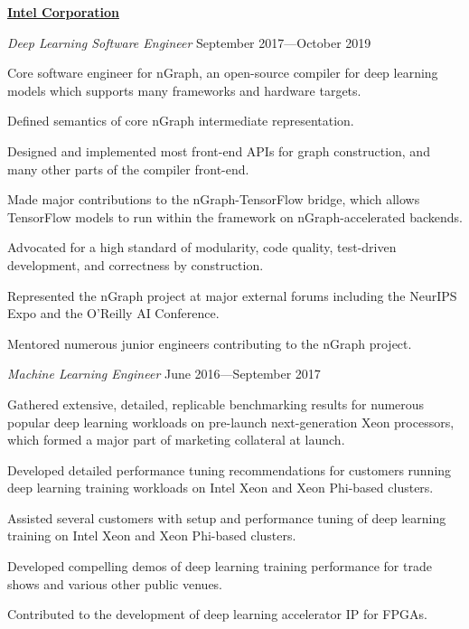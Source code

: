 \documentclass[10pt]{article}
\newenvironment{outerlist}[1][\enskip\textbullet]%
        {\begin{itemize}[#1]}{\end{itemize}%
         \vspace{-.6\baselineskip}}
\newenvironment{innerlist}[1][\enskip\textbullet]%
        {\begin{compactitem}[#1]}{\end{compactitem}}
\begin{document}
\textbf{\href{https://www.intel.com/}{Intel Corporation}}
\begin{outerlist}
\item[] \textit{Deep Learning Software Engineer} \hfill September 2017---October 2019
        \begin{innerlist}
        \item Core software engineer for nGraph, an open-source compiler for deep learning models which supports many frameworks and hardware targets.
        \item Defined semantics of core nGraph intermediate representation.
        \item Designed and implemented most front-end APIs for graph construction, and many other parts of the compiler front-end.
        \item Made major contributions to the nGraph-TensorFlow bridge, which allows TensorFlow models to run within the framework on nGraph-accelerated backends.
        \item Advocated for a high standard of modularity, code quality, test-driven development, and correctness by construction.
        \item Represented the nGraph project at major external forums including the NeurIPS Expo and the O'Reilly AI Conference.
        \item Mentored numerous junior engineers contributing to the nGraph project.
        \end{innerlist}
\item[] \textit{Machine Learning Engineer} \hfill June 2016---September 2017
        \begin{innerlist}
        \item Gathered extensive, detailed, replicable benchmarking results for numerous popular deep learning workloads on pre-launch next-generation Xeon processors, which formed a major part of marketing collateral at launch.
        \item Developed detailed performance tuning recommendations for customers running deep learning training workloads on Intel Xeon and Xeon Phi-based clusters.
        \item Assisted several customers with setup and performance tuning of deep learning training on Intel Xeon and Xeon Phi-based clusters.
        \item Developed compelling demos of deep learning training performance for trade shows and various other public venues.
        \item Contributed to the development of deep learning accelerator IP for FPGAs.
        \end{innerlist}
\end{outerlist}
\end{document}
